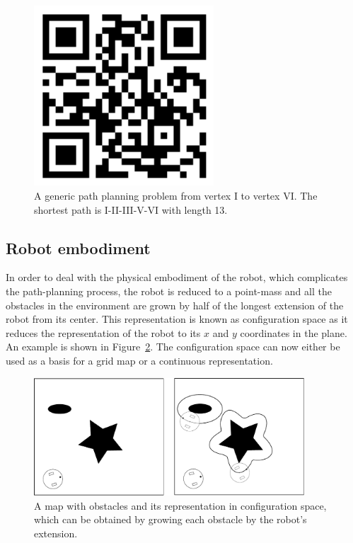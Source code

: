 \begin{figure}[!htb]
\centering
\includegraphics[width=0.6\textwidth]{figs/dijkstra}
\caption{A generic path planning problem from vertex I to vertex VI. The shortest path is I-II-III-V-VI with length 13. \label{fig:pathproblem}}
\end{figure}

\subsection{Robot embodiment}
In order to deal with the physical embodiment of the robot, which complicates the path-planning process, the robot is reduced to a point-mass and all the obstacles in the environment are grown by half of the longest extension of the robot from its center. This representation is known as configuration space as it reduces the representation of the robot to its $x$ and $y$ coordinates in the plane. An example is shown in Figure~\ref{fig:cspace}. The configuration space can now either be used as a basis for a grid map or a continuous representation.

\begin{figure}[!htb]
\centering
\includegraphics[width=0.9\textwidth]{figs/configurationspace}
\caption{A map with obstacles and its representation in configuration space, which can be obtained by growing each obstacle by the robot's extension. \label{fig:cspace}}
\end{figure}


